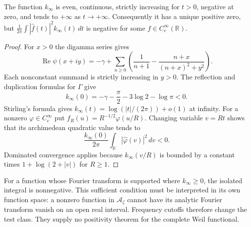 \begin{proposition}
\label{syn-arith:gamma-negative}
The function $k_\infty$ is even, continuous, strictly increasing for $t>0$,
negative at zero, and tends to $+\infty$ as $t\to+\infty$.
Consequently it has a unique positive zero, but
$\frac1{2\pi}\int|\widehat f(t)|^2k_\infty(t)\,dt$ is negative for some
$f\in C_c^\infty(\mathbb R)$.
\end{proposition}
\begin{proof}
For $x>0$ the digamma series gives
\[
 \operatorname{Re}\psi(x+iy)=-\gamma+
 \sum_{n\geq0}\left(\frac1{n+1}-\frac{n+x}{(n+x)^2+y^2}\right).
\]
Each nonconstant summand is strictly increasing in $y>0$.
The reflection and duplication formulas for $\Gamma$ give
\[
 k_\infty(0)=-\gamma-\frac\pi2-3\log2-\log\pi<0.
\]
Stirling's formula gives
$k_\infty(t)=\log(|t|/(2\pi))+o(1)$ at infinity.
For a nonzero $\varphi\in C_c^\infty$ put
$f_R(u)=R^{-1/2}\varphi(u/R)$.  Changing variable $v=Rt$ shows that its
archimedean quadratic value tends to
\[
 \frac{k_\infty(0)}{2\pi}\int_{\mathbb R}|\widehat\varphi(v)|^2\,dv<0.
\]
Dominated convergence applies because $k_\infty(v/R)$ is bounded by a
constant times $1+\log(2+|v|)$ for $R\geq1$.
\end{proof}

For a function whose Fourier transform is supported where $k_\infty\geq0$,
the isolated integral is nonnegative.  This sufficient condition must be
interpreted in its own function space: a nonzero function in
$\mathcal A_\zeta$ cannot have its analytic Fourier transform vanish on an
open real interval.  Frequency cutoffs therefore change the test class.
They supply no positivity theorem for the complete Weil functional.

